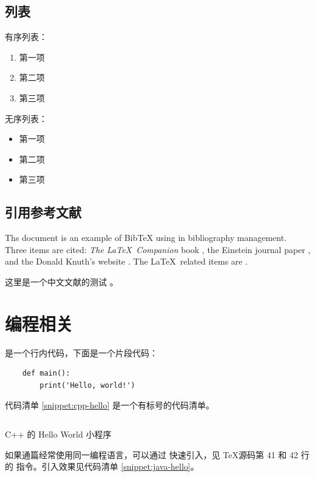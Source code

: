 \documentclass[a4paper, 11pt]{ctexart}
\begin{document}
\subsection{列表}

有序列表：

\begin{enumerate}
    \item 第一项
    \item 第二项
    \item 第三项
\end{enumerate}

无序列表：

\begin{itemize}
    \item 第一项
    \item 第二项
    \item 第三项
\end{itemize}

\subsection{引用参考文献}

Ths document is an example of BibTeX using in bibliography management. Three items
are cited: \textit{The \LaTeX\ Companion} book \cite{latexcompanion}, the Einstein
journal paper \cite{einstein}, and the Donald Knuth's website \cite{knuthwebsite}.
The \LaTeX\ related items are \cite{latexcompanion,knuthwebsite}.

这里是一个中文文献的测试 \cite{wikipedia-cn}。

\clearpage
\section{编程相关}

 是一个行内代码，下面是一个片段代码：

\begin{verbatim}
    def main():
        print('Hello, world!')
\end{verbatim}

代码清单 \ref{snippet:cpp-hello} 是一个有标号的代码清单。

\begin{listing}[htp]
    \inputminted{cpp}{snippets/main.cpp}
    \caption{C++ 的 Hello World 小程序}
    \label{snippet:cpp-hello}
\end{listing}

如果通篇经常使用同一编程语言，可以通过  快速引入，见 \TeX 源码第 41 和 42 行的  指令。引入效果见代码清单 \ref{snippet:java-hello}。
\end{document}
